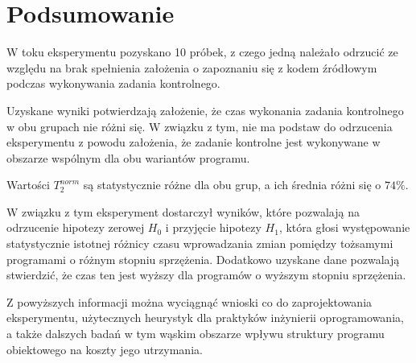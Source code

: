 \section{Podsumowanie}

W toku eksperymentu pozyskano 10 próbek, z czego jedną należało odrzucić
ze względu na brak spełnienia założenia o zapoznaniu się z kodem źródłowym
podczas wykonywania zadania kontrolnego.

Uzyskane wyniki potwierdzają założenie, że czas wykonania zadania kontrolnego
w obu grupach nie różni się.
W związku z tym, nie ma podstaw do odrzucenia eksperymentu z powodu założenia,
że zadanie kontrolne jest wykonywane w obszarze wspólnym dla obu wariantów
programu.

Wartości \(T_{2}^{norm}\) są statystycznie różne dla obu grup, a ich średnia
różni się o \(74\%\).

W związku z tym eksperyment dostarczył wyników, które pozwalają na odrzucenie
hipotezy zerowej \(H_{0}\) i przyjęcie hipotezy \(H_{1}\), która głosi występowanie
statystycznie istotnej różnicy czasu wprowadzania zmian pomiędzy tożsamymi
programami o różnym stopniu sprzężenia.
Dodatkowo uzyskane dane pozwalają stwierdzić, że czas ten jest wyższy dla programów
o wyższym stopniu sprzężenia.

Z powyższych informacji można wyciągnąć wnioski co do zaprojektowania eksperymentu,
użytecznych heurystyk dla praktyków inżynierii oprogramowania, a także dalszych badań
w tym wąskim obszarze wpływu struktury programu obiektowego na koszty jego utrzymania.
